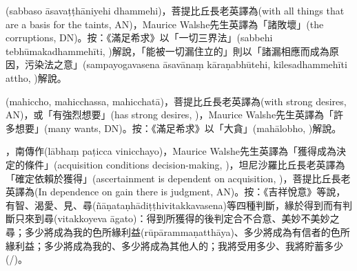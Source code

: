 \startitemgroup[noteitems]
\item{}(sabbaso āsavaṭṭhāniyehi dhammehi)，菩提比丘長老英譯為(with all things that are a basis for the taints, AN)，Maurice Walshe先生英譯為「諸敗壞」(the corruptions, DN)。按：《滿足希求》以「一切三界法」(sabbehi tebhūmakadhammehīti, )解說，「能被一切漏住立的」則以「諸漏相應而成為原因，污染法之意」(sampayogavasena āsavānaṃ kāraṇabhūtehi, kilesadhammehīti attho, )解說。
\stopitemgroup

\startitemgroup[noteitems]
\item{}(mahiccho, mahicchassa, mahicchatā)，菩提比丘長老英譯為(with strong desires, AN)，或「有強烈想要」(has strong desires, )，Maurice Walshe先生英譯為「許多想要」(many wants, DN)。按：《滿足希求》以「大貪」(mahālobho, )解說。
\stopitemgroup

\startitemgroup[noteitems]
\item{}，南傳作(lābhaṃ paṭicca vinicchayo)，Maurice Walshe先生英譯為「獲得成為決定的條件」(acquisition conditions decision-making, )，坦尼沙羅比丘長老英譯為「確定依賴於獲得」(ascertainment is dependent on acquisition, )，菩提比丘長老英譯為(In dependence on gain there is judgment, AN)。按：《吉祥悅意》等說，有智、渴愛、見、尋(ñāṇataṇhādiṭṭhivitakkavasena)等四種判斷，緣於得到而有判斷只來到尋(vitakkoyeva āgato)：得到所獲得的後判定合不合意、美妙不美妙之尋；多少將成為我的色所緣利益(rūpārammaṇatthāya)、多少將成為有信者的色所緣利益；多少將成為我的、多少將成為其他人的；我將受用多少、我將貯蓄多少(/)。
\stopitemgroup

